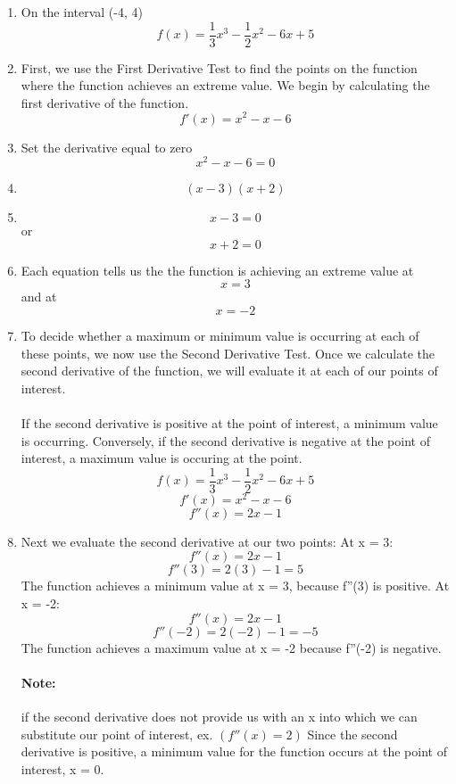 \documentclass[a4paper,11pt]{book}
\begin{document}
\begin{enumerate}
  \LARGE
  \item \normalsize On the interval (-4, 4) \LARGE \[ f(x) = \frac{1}{3}x^3 - \frac{1}{2}x^2 - 6x + 5 \]
  \item \normalsize First, we use the First Derivative Test to find the points on the function where the function achieves an extreme value. We begin by calculating the first derivative of the function. \LARGE \[ f'(x) = x^2 - x - 6 \]
  \item \normalsize Set the derivative equal to zero \LARGE \[ x^2 - x - 6 = 0 \]
  \item \[ (x - 3)(x + 2) \]
  \item \LARGE \[ x - 3 = 0 \] \normalsize or \LARGE \[ x + 2 = 0 \] \LARGE
  \item \normalsize Each equation tells us the the function is achieving an extreme value at \LARGE \[ x = 3 \]  \normalsize and at \LARGE \[ x = -2 \] 
  \item \normalsize To decide whether a maximum or minimum value is occurring at each of these points, we now use the Second Derivative Test. Once we calculate the second derivative of the function, we will evaluate it at each of our points of interest. \\ \\ If the second derivative is positive at the point of interest, a minimum value is occurring. Conversely, if the second derivative is negative at the point of interest, a maximum value is occuring at the point. \LARGE 
  \[ f(x) = \frac{1}{3}x^3 - \frac{1}{2}x^2 - 6x + 5 \]
  \[ f'(x) =  x^2 - x - 6  \]
  \[ f''(x) =  2x - 1 \]

  \item \normalsize Next we evaluate the second derivative at our two points: At x = 3: 
  \LARGE
  \[ f''(x) =  2x - 1 \]
  \[ f''(3) =  2(3) - 1 = 5 \]
  \normalsize The function achieves a minimum value at x = 3, because f''(3) is positive.
  At x = -2: 
  \LARGE
  \[ f''(x) =  2x - 1 \]
  \[ f''(-2) =  2(-2) - 1 = - 5 \]
  \normalsize The function achieves a maximum value at x = -2 because f''(-2) is negative.
  
  \paragraph{Note:} if the second derivative does not provide us with an x into which we can substitute our point of interest, ex. $ (f''(x)=2) $ Since the second derivative is positive, a minimum value for the function occurs at the point of interest, x = 0.
  
\end{enumerate}
\end{document}
